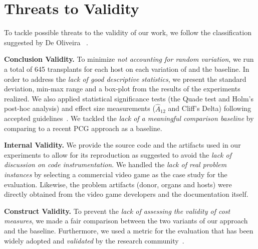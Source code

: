 \section{Threats to Validity}
\label{sec:Threats}

To tackle possible threats to the validity of our work, we follow the classification suggested by De Oliveira \etal~\cite{oliveira2011threats}.

\textbf{Conclusion Validity.}
To minimize \textit{not accounting for random variation}, we run a total of 645 transplants for each host on each variation of \ApproachName{} and the baseline.
In order to address the \textit{lack of good descriptive statistics}, we present the standard deviation, min-max range and a box-plot from the results of the experiments realized. We also applied statistical significance tests (the Quade test and Holm’s post-hoc analysis) and effect size measurements ($\hat{A}_{12}$ and Cliff’s Delta) following accepted guidelines~\cite{arcuri2013parameter}.
We tackled the \textit{lack of a meaningful comparison baseline} by comparing \ApproachName{} to a recent PCG approach as a baseline. 


\textbf{Internal Validity.}
We provide the source code and the artifacts used in our experiments to allow for its reproduction as suggested to avoid the \textit{lack of discussion on code instrumentation}.
We handled the \textit{lack of real problem instances} by selecting a commercial video game as the case study for the evaluation. Likewise, the problem artifacts (donor, organs and hosts) were directly obtained from the video game developers and the documentation itself. 

\textbf{Construct Validity.}
To prevent the \textit{lack of assessing the validity of cost measures}, we made a fair comparison between the two variants of our approach and the baseline. Furthermore, we used a metric for the evaluation that has been widely adopted and \textit{validated} by the research community~\cite{browne2010evolutionary}.

